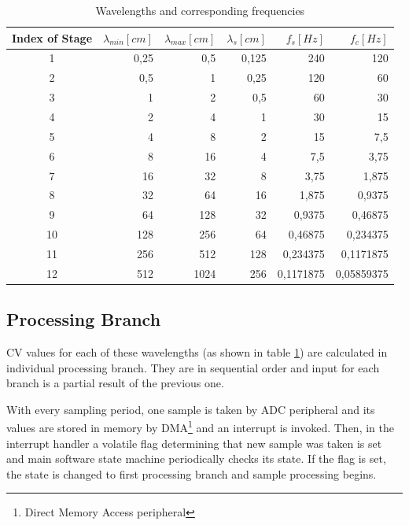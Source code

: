 \documentclass[twoside]{ctuthesis}
\theoremstyle{plain}
\theoremstyle{definition}
\theoremstyle{note}
\begin{document}
\begin{table}[htbp]
	\centering
	\caption{Wavelengths and corresponding frequencies}
	\begin{tabular}{crrrrr}
		\toprule
		Index of Stage & $\lambda_{min} [cm]$ & $\lambda_{max} [cm]$ & $\lambda_{s} [cm]$ & $f_s [Hz]$ & $f_c [Hz]$ \\
		\midrule
    1     & 0,25  & 0,5   & 0,125 & 240   & 120 \\
    2     & 0,5   & 1     & 0,25  & 120   & 60 \\
    3     & 1     & 2     & 0,5   & 60    & 30 \\
    4     & 2     & 4     & 1     & 30    & 15 \\
    5     & 4     & 8     & 2     & 15    & 7,5 \\
    6     & 8     & 16    & 4     & 7,5   & 3,75 \\
    7     & 16    & 32    & 8     & 3,75  & 1,875 \\
    8     & 32    & 64    & 16    & 1,875 & 0,9375 \\
    9     & 64    & 128   & 32    & 0,9375 & 0,46875 \\
    10    & 128   & 256   & 64    & 0,46875 & 0,234375 \\
    11    & 256   & 512   & 128   & 0,234375 & 0,1171875 \\
    12    & 512   & 1024  & 256   & 0,1171875 & 0,05859375 \\

		\bottomrule
	\end{tabular}%
	\label{tab:Wavelengths}%
\end{table}%

\subsection{Processing Branch}
\label{processingBranch_sliver}
CV values for each of these wavelengths (as shown in table \ref{tab:Wavelengths}) are calculated in individual processing branch. They are in sequential order and input for each branch is a partial result of the previous one.

With every sampling period, one sample is taken by ADC peripheral and its values are stored in memory by DMA\footnote{Direct Memory Access peripheral} and an interrupt is invoked. Then, in the interrupt handler a volatile flag determining that new sample was taken is set and main software state machine periodically checks its state. If the flag is set, the state is changed to first processing branch and sample processing begins.
\end{document}
